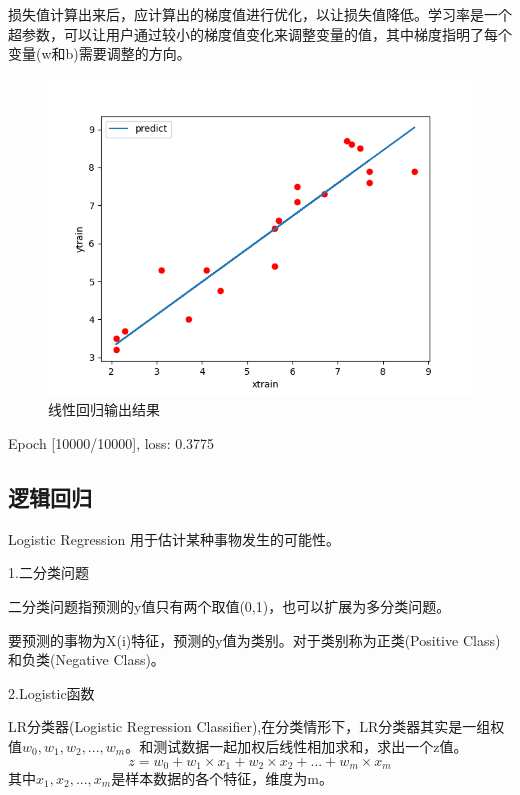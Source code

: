 \documentclass[openbib]{article}
\begin{document}
损失值计算出来后，应计算出的梯度值进行优化，以让损失值降低。学习率是一个超参数，可以让用户通过较小的梯度值变化来调整变量的值，其中梯度指明了每个变量(w和b)需要调整的方向。
\begin{figure}[htbp]
	\centering
	\includegraphics[scale=0.4]{线性回归.png}
	\caption{线性回归输出结果}
\end{figure}

Epoch [10000/10000], loss: 0.3775

\subsection{逻辑回归}

Logistic Regression 用于估计某种事物发生的可能性。

1.二分类问题

二分类问题指预测的y值只有两个取值(0,1)，也可以扩展为多分类问题。

要预测的事物为X(i)特征，预测的y值为类别。对于类别称为正类(Positive Class)和负类(Negative Class)。

2.Logistic函数

LR分类器(Logistic Regression Classifier),在分类情形下，LR分类器其实是一组权值$w_{0},w_{1},w_{2},...,w_{m}$。和测试数据一起加权后线性相加求和，求出一个z值。
$$ z = w_{0} + w_{1} \times x_{1} + w_{2} \times x_{2} +...+ w_{m} \times x_{m}$$
其中$x_1, x_2, ...,x_m$是样本数据的各个特征，维度为m。
\end{document}
